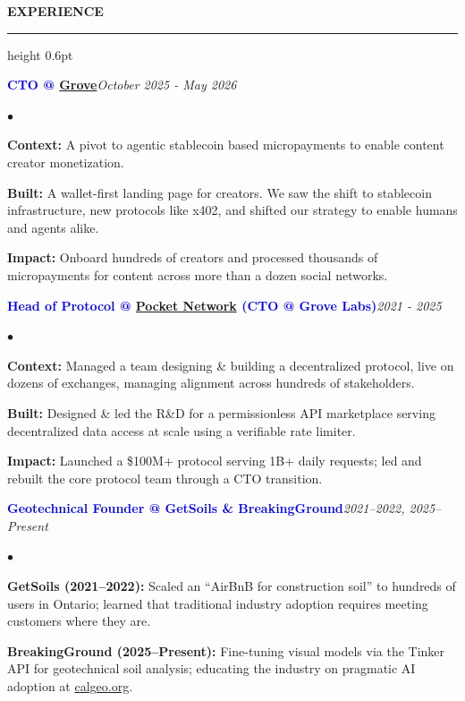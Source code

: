\documentclass[10pt]{resume}
\newenvironment{rSectionCompact}[1]{
  \medskip
  \vspace{0.45em}
  \textbf{\textcolor{Cerulean}{\MakeUppercase{#1}}}
  \vspace{0.3em}
  {\color{Blue}\hrule height 0.6pt}
  \vspace{0.85em}
  \begin{list}{}{
    \setlength{\leftmargin}{0em}
  }
  \item[]
}{
    \vspace{0.25em}
    \end{list}
}
\newenvironment{rJobCompact}[2]{
  \normalsize
  \textcolor{Blue}{\textbf{#1}}\hfill\textit{#2}
  \vspace{0.08em}
  \begin{list}{$\bullet$}{
    \setlength{\leftmargin}{1.6em}
    \setlength{\itemsep}{-0.05em}
    \setlength{\topsep}{0pt}
    \setlength{\partopsep}{0pt}
    \setlength{\parsep}{0pt}
  }
}{
    \end{list}
    \vspace{0.35em}
}
\begin{document}
\begin{rSectionCompact}{Experience}

    \begin{rJobCompact}{CTO @ \href{https://grove.city}{Grove}}{October 2025 - May 2026}
        \item \textbf{Context:} A pivot to agentic stablecoin based micropayments to enable content creator monetization.
        \item \textbf{Built:} A wallet-first landing page for creators. We saw the shift to stablecoin infrastructure, new protocols like x402, and shifted our strategy to enable humans and agents alike.
        \item \textbf{Impact:} Onboard hundreds of creators and processed thousands of micropayments for content across more than a dozen social networks.
    \end{rJobCompact}

    \begin{rJobCompact}{Head of Protocol @ \href{https://pokt.network}{Pocket Network} (CTO @ Grove Labs)}{2021 - 2025}
        \item \textbf{Context:} Managed a team designing \& building a decentralized protocol, live on dozens of exchanges, managing alignment across hundreds of stakeholders.
        \item \textbf{Built:} Designed \& led the R\&D for a permissionless API marketplace serving decentralized data access at scale using a verifiable rate limiter.
        \item \textbf{Impact:} Launched a \$100M+ protocol serving 1B+ daily requests; led and rebuilt the core protocol team through a CTO transition.
    \end{rJobCompact}

    \begin{rJobCompact}{Geotechnical Founder @ GetSoils \& BreakingGround}{2021--2022, 2025--Present}
        \item \textbf{GetSoils (2021--2022):} Scaled an ``AirBnB for construction soil'' to hundreds of users in Ontario; learned that traditional industry adoption requires meeting customers where they are.
        \item \textbf{BreakingGround (2025--Present):} Fine-tuning visual models via the Tinker API for geotechnical soil analysis; educating the industry on pragmatic AI adoption at \href{https://calgeo.org/}{calgeo.org}.
    \end{rJobCompact}


\end{rSectionCompact}
\end{document}
